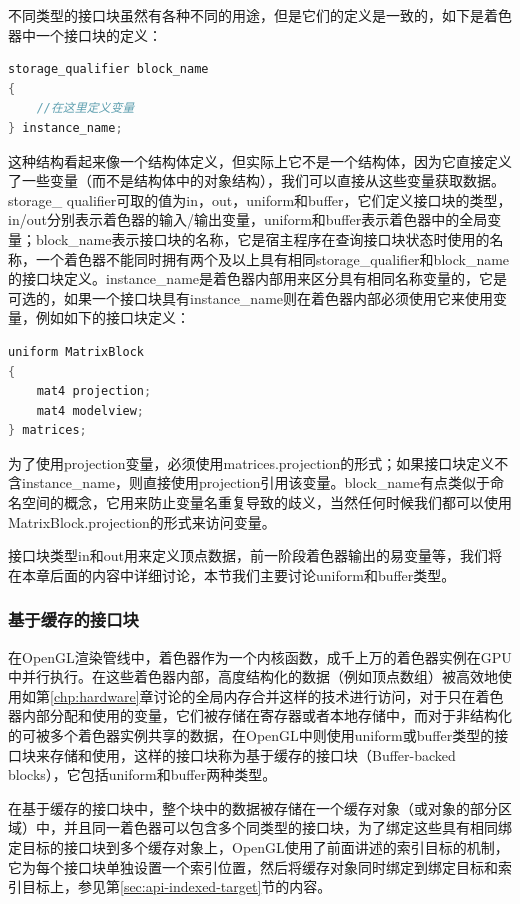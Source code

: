 不同类型的接口块虽然有各种不同的用途，但是它们的定义是一致的，如下是着色器中一个接口块的定义：

\begin{lstlisting}[language=C++]
storage_qualifier block_name
{
	//在这里定义变量
} instance_name;
\end{lstlisting}

这种结构看起来像一个结构体定义，但实际上它不是一个结构体，因为它直接定义了一些变量（而不是结构体中的对象结构），我们可以直接从这些变量获取数据。storage\_ qualifier可取的值为in，out，uniform和buffer，它们定义接口块的类型，in/out分别表示着色器的输入/输出变量，uniform和buffer表示着色器中的全局变量；block\_name表示接口块的名称，它是宿主程序在查询接口块状态时使用的名称，一个着色器不能同时拥有两个及以上具有相同storage\_qualifier和block\_name的接口块定义。instance\_name是着色器内部用来区分具有相同名称变量的，它是可选的，如果一个接口块具有instance\_name则在着色器内部必须使用它来使用变量，例如如下的接口块定义：

\begin{lstlisting}[language=C++]
uniform MatrixBlock
{
	mat4 projection;
	mat4 modelview;
} matrices;
\end{lstlisting}

为了使用projection变量，必须使用matrices.projection的形式；如果接口块定义不含instance\_name，则直接使用projection引用该变量。block\_name有点类似于命名空间的概念，它用来防止变量名重复导致的歧义，当然任何时候我们都可以使用MatrixBlock.projection的形式来访问变量。

接口块类型in和out用来定义顶点数据，前一阶段着色器输出的易变量等，我们将在本章后面的内容中详细讨论，本节我们主要讨论uniform和buffer类型。




\subsubsection{基于缓存的接口块}
在OpenGL渲染管线中，着色器作为一个内核函数，成千上万的着色器实例在GPU中并行执行。在这些着色器内部，高度结构化的数据（例如顶点数组）被高效地使用如第\ref{chp:hardware}章讨论的全局内存合并这样的技术进行访问，对于只在着色器内部分配和使用的变量，它们被存储在寄存器或者本地存储中，而对于非结构化的可被多个着色器实例共享的数据，在OpenGL中则使用uniform或buffer类型的接口块来存储和使用，这样的接口块称为基于缓存的接口块（Buffer-backed blocks），它包括uniform和buffer两种类型。

在基于缓存的接口块中，整个块中的数据被存储在一个缓存对象（或对象的部分区域）中，并且同一着色器可以包含多个同类型的接口块，为了绑定这些具有相同绑定目标的接口块到多个缓存对象上，OpenGL使用了前面讲述的索引目标的机制，它为每个接口块单独设置一个索引位置，然后将缓存对象同时绑定到绑定目标和索引目标上，参见第\ref{sec:api-indexed-target}节的内容。

